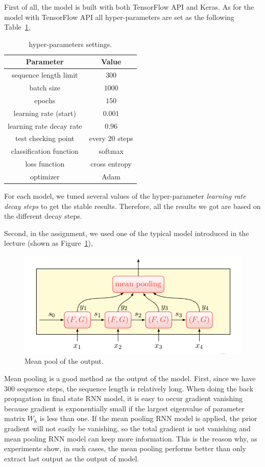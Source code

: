 \documentclass[12pt,letterpaper]{article}
\begin{document}
First of all, the model is built with both TensorFlow API and Keras. As for the model with TensorFlow API all hyper-parameters are set as the following Table~\ref{T:parameters},
\begin{table}[h]
        \centering
        \vspace{\baselineskip}
        \caption{hyper-parameters settings.}\label{T:parameters}
      \begin{tabular}{cc}
        \hline
        Parameter & Value\\
        \hline
        sequence length limit & $300$\\
        batch size & $1000$\\
        epochs & $150$\\
        learning rate (start) & $0.001$\\
        learning rate decay rate & $0.96$\\
        test checking point & every $20$ steps\\
        classification function & softmax\\
        loss function & cross entropy\\
        optimizer & Adam\\
        \hline
      \end{tabular}
\end{table}
For each model, we tuned several values of the hyper-parameter \emph{learning rate decay steps} to get the stable results. Therefore, all the results we got are based on the different decay steps.

Second, in the assignment, we used one of the typical model introduced in the lecture (shown as Figure~\ref{fig:mode}),
\begin{figure}[h]
    \centering
    \includegraphics[width=.6\linewidth]{mode.png}
    \caption{\small Mean pool of the output.}
    \label{fig:mode}
\end{figure}

Mean pooling is a good method as the output of the model. First, since we have $300$ sequence steps, the sequence length is relatively long. When doing the back propagation in final state RNN model, it is easy to occur gradient vanishing because gradient is exponentially small if the largest eigenvalue of parameter matrix $W_h$ is less than one. If the mean pooling RNN model is applied, the prior gradient will not easily be vanishing, so the total gradient is not vanishing and mean pooling RNN model can keep more information. This is the reason why, as experiments show, in such cases, the mean pooling performs better than only extract last output as the output of model.
\end{document}
